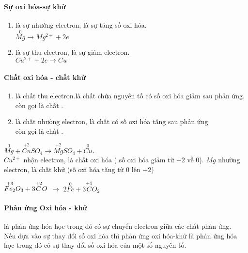 \begin{body}
	\paragraph{Sự oxi hóa-sự khử}
	\begin{mylt}
		\begin{enumerate}[label = \indam{\alph*)}]
			\item {} là sự nhường electron, là sự tăng số oxi hóa.\\
			 $\overset{0}{Mg} \rightarrow Mg^{2+} + 2e$
			\item {} là sự thu electron, là sự giảm electron.\\
			 $Cu^{2+} +2e \rightarrow Cu $
		\end{enumerate}
	\end{mylt}
	\paragraph{Chất oxi hóa - chất khử}
	\begin{mylt}
		\begin{enumerate}[label = \indam{\alph*)}]
			\item {} là chất thu electron.là chất chứa nguyên tố có số oxi hóa giảm sau phản ứng.\\
			 còn gọi là chất \indam{bị khử}.
			\item {} là chất nhường electron, là chất có số oxi hóa tăng sau phản ứng\\
			 còn gọi là chất \indam{bị oxi hóa}.
		\end{enumerate}
	\end{mylt}
	\begin{vdnote}
		$ \overset{0}{Mg} + \overset{+2}{Cu}SO_{4} \rightarrow\overset{+2}{Mg}SO_{4}  + \overset{0}{Cu}$.\\
		$Cu^{2+}$ nhận electron, là chất oxi hóa ( số oxi hóa giảm từ +2 về 0).
		$Mg$ nhường electron, là chất khử (số oxi hóa tăng từ 0 lên +2)
	\end{vdnote}
	\begin{vdnote}
		$\overset{+3}{Fe_2}\overset{\vphantom{+3}}{O_3} + 3\overset{+2}{C}O$ $\longrightarrow$ $ 2 \overset{0}{Fe} + 3\overset{+4}{C}O_2$
	\end{vdnote}
	\paragraph{Phản ứng Oxi hóa - khử }
	\begin{mylt}
		 là phản ứng hóa học trong đó có sự chuyển electron giữa các chất phản ứng.\\
		Nếu dựa vào sự thay đổi số oxi hóa thì phản ứng oxi hóa-khử là phản ứng hóa học trong đó có sự  thay đổi số oxi hóa của một số nguyên tố.\\
		

\end{mylt}
\end{body}

